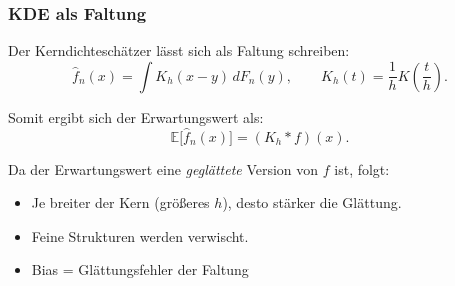 \documentclass{beamer}
\newif\ifpauseswitch
\begin{document}
	\begin{frame}
		\frametitle{KDE als Faltung}
		
		Der Kerndichteschätzer lässt sich als Faltung schreiben:
		\[
		\hat{f}_n(x) = \int K_h(x-y)\,dF_n(y),
		\qquad
		K_h(t)=\frac{1}{h} K\!\left(\frac{t}{h}\right).
		\]
		
		\ifpauseswitch
		\pause
		\fi
		
		\vspace{0.5em}
		
		Somit ergibt sich der Erwartungswert als:
		\[
		\mathbb{E}\bigl[\hat{f}_n(x)\bigr] = (K_h * f)(x).
		\]
		
		Da der Erwartungswert eine \textit{geglättete} Version von $f$ ist, folgt:
		\begin{itemize}
			\itemsep6pt
			\item Je breiter der Kern (größeres $h$), desto stärker die Glättung.
			\item Feine Strukturen werden verwischt.
			\item \alert{Bias = Glättungsfehler der Faltung}
		\end{itemize}
	\end{frame}
	
\end{document}
